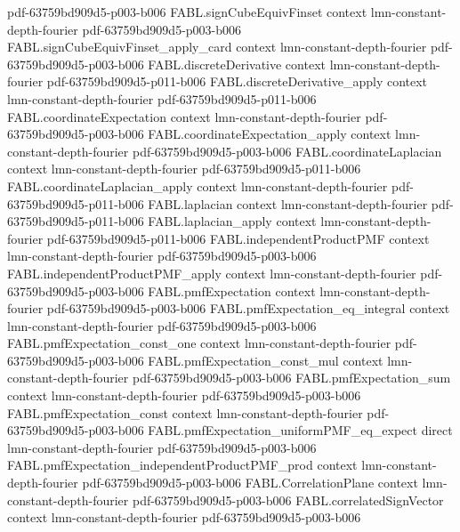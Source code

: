 \begin{theorem}[Parseval]
  {pdf-63759bd909d5-p003-b006}
\proofstep
  {FABL.signCubeEquivFinset}
  {context}
  {lmn-constant-depth-fourier}
  {pdf-63759bd909d5-p003-b006}
\proofstep
  {FABL.signCubeEquivFinset_apply_card}
  {context}
  {lmn-constant-depth-fourier}
  {pdf-63759bd909d5-p003-b006}
\proofstep
  {FABL.discreteDerivative}
  {context}
  {lmn-constant-depth-fourier}
  {pdf-63759bd909d5-p011-b006}
\proofstep
  {FABL.discreteDerivative_apply}
  {context}
  {lmn-constant-depth-fourier}
  {pdf-63759bd909d5-p011-b006}
\proofstep
  {FABL.coordinateExpectation}
  {context}
  {lmn-constant-depth-fourier}
  {pdf-63759bd909d5-p003-b006}
\proofstep
  {FABL.coordinateExpectation_apply}
  {context}
  {lmn-constant-depth-fourier}
  {pdf-63759bd909d5-p003-b006}
\proofstep
  {FABL.coordinateLaplacian}
  {context}
  {lmn-constant-depth-fourier}
  {pdf-63759bd909d5-p011-b006}
\proofstep
  {FABL.coordinateLaplacian_apply}
  {context}
  {lmn-constant-depth-fourier}
  {pdf-63759bd909d5-p011-b006}
\proofstep
  {FABL.laplacian}
  {context}
  {lmn-constant-depth-fourier}
  {pdf-63759bd909d5-p011-b006}
\proofstep
  {FABL.laplacian_apply}
  {context}
  {lmn-constant-depth-fourier}
  {pdf-63759bd909d5-p011-b006}
\proofstep
  {FABL.independentProductPMF}
  {context}
  {lmn-constant-depth-fourier}
  {pdf-63759bd909d5-p003-b006}
\proofstep
  {FABL.independentProductPMF_apply}
  {context}
  {lmn-constant-depth-fourier}
  {pdf-63759bd909d5-p003-b006}
\proofstep
  {FABL.pmfExpectation}
  {context}
  {lmn-constant-depth-fourier}
  {pdf-63759bd909d5-p003-b006}
\proofstep
  {FABL.pmfExpectation_eq_integral}
  {context}
  {lmn-constant-depth-fourier}
  {pdf-63759bd909d5-p003-b006}
\proofstep
  {FABL.pmfExpectation_const_one}
  {context}
  {lmn-constant-depth-fourier}
  {pdf-63759bd909d5-p003-b006}
\proofstep
  {FABL.pmfExpectation_const_mul}
  {context}
  {lmn-constant-depth-fourier}
  {pdf-63759bd909d5-p003-b006}
\proofstep
  {FABL.pmfExpectation_sum}
  {context}
  {lmn-constant-depth-fourier}
  {pdf-63759bd909d5-p003-b006}
\proofstep
  {FABL.pmfExpectation_const}
  {context}
  {lmn-constant-depth-fourier}
  {pdf-63759bd909d5-p003-b006}
\proofstep
  {FABL.pmfExpectation_uniformPMF_eq_expect}
  {direct}
  {lmn-constant-depth-fourier}
  {pdf-63759bd909d5-p003-b006}
\proofstep
  {FABL.pmfExpectation_independentProductPMF_prod}
  {context}
  {lmn-constant-depth-fourier}
  {pdf-63759bd909d5-p003-b006}
\proofstep
  {FABL.CorrelationPlane}
  {context}
  {lmn-constant-depth-fourier}
  {pdf-63759bd909d5-p003-b006}
\proofstep
  {FABL.correlatedSignVector}
  {context}
  {lmn-constant-depth-fourier}
  {pdf-63759bd909d5-p003-b006}

\end{theorem}
